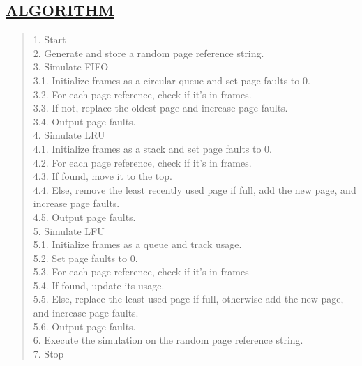 \documentclass[a4paper, 12pt]{article}
\begin{document}
\subsection*{\underline{ALGORITHM}}
\begin{quote}
1. Start\\
2. Generate and store a random page reference string.\\
3. Simulate FIFO\\
\hspace*{1cm} 3.1. Initialize frames as a circular queue and set page faults to 0. \\
\hspace*{1cm} 3.2. For each page reference, check if it's in frames.\\
\hspace*{1cm} 3.3. If not, replace the oldest page and increase page faults.\\
\hspace*{1cm} 3.4. Output page faults.\\
4. Simulate LRU \\
\hspace*{1cm} 4.1. Initialize frames as a stack and set page faults to 0.\\
\hspace*{1cm} 4.2. For each page reference, check if it's in frames.\\
\hspace*{1cm} 4.3. If found, move it to the top.\\
\hspace*{1cm} 4.4. Else, remove the least recently used page if full, add the new page, and increase page faults.\\
\hspace*{1cm} 4.5. Output page faults.\\
5. Simulate LFU \\
\hspace*{1cm} 5.1. Initialize frames as a queue and track usage.\\
\hspace*{1cm} 5.2. Set page faults to 0.\\
\hspace*{1cm} 5.3. For each page reference, check if it's in frames\\
\hspace*{1cm} 5.4. If found, update its usage.\\
\hspace*{1cm} 5.5. Else, replace the least used page if full, otherwise add the new page, and increase page faults.\\
\hspace*{1cm} 5.6. Output page faults.\\
6. Execute the simulation on the random page reference string.\\
7. Stop \\
\end{quote}
\end{document}
